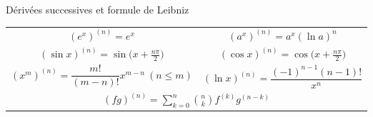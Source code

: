 \documentclass[10pt,a4paper,landscape]{article}
\begin{document}
\begin{minipage}[t]{0.495\textwidth}
\vspace{6pt}
\begin{cbox}{Dérivées successives et formule de Leibniz}
\centering
\begin{tabular}{c@{\qquad}c}
$(e^x)^{(n)}=e^x$ & $(a^x)^{(n)}=a^x(\ln a)^n$\\[3pt]
$(\sin x)^{(n)}=\sin\!\big(x+\tfrac{n\pi}{2}\big)$ & $(\cos x)^{(n)}=\cos\!\big(x+\tfrac{n\pi}{2}\big)$\\[3pt]
$(x^m)^{(n)}=\dfrac{m!}{(m-n)!}x^{m-n}\ (n\le m)$ & $(\ln x)^{(n)}=\dfrac{(-1)^{n-1}(n-1)!}{x^n}$\\[5pt]
\multicolumn{2}{c}{$\displaystyle (fg)^{(n)}=\sum_{k=0}^{n}\binom{n}{k}f^{(k)}g^{(n-k)}$}
\end{tabular}
\end{cbox}
\end{minipage}\hfill
\end{document}
